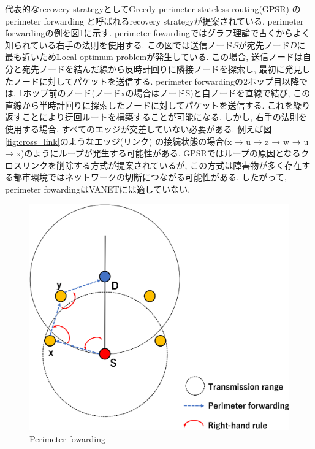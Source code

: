 \documentclass[10pt]{jreport}
\begin{document}
代表的なrecovery strategyとしてGreedy perimeter stateless routing(GPSR) \cite{6}の perimeter forwarding
と呼ばれるrecovery strategyが提案されている. perimeter forwardingの例を図\ref{fig:Perimeter}に示す. perimeter fowardingではグラフ理論で古くからよく知られている右手の法則を使用する. この図では送信ノード$S$が宛先ノード$D$に最も近いためLocal optimum problemが発生している. この場合, 送信ノードは自分と宛先ノードを結んだ線から反時計回りに隣接ノードを探索し, 最初に発見したノードに対してパケットを送信する. perimeter forwardingの2ホップ目以降では, 1ホップ前のノード(ノードxの場合はノードS)と自ノードを直線で結び, この直線から半時計回りに探索したノードに対してパケットを送信する. これを繰り返すことにより迂回ルートを構築することが可能になる. 
しかし, 右手の法則を使用する場合, すべてのエッジが交差していない必要がある. 例えば図\ref{fig:cross_link}のようなエッジ(リンク) の接続状態の場合(x → u → z → w → u → x)のようにループが発生する可能性がある. GPSRではループの原因となるクロスリンクを削除する方式が提案されているが, この方式は障害物が多く存在する都市環境ではネットワークの切断につながる可能性がある. したがって, perimeter fowardingはVANETには適していない.




\begin{figure}[!ht]
	\centering
	\includegraphics[width=130mm]{figures/Perimeter.eps}
	\caption{Perimeter fowarding}
	\label{fig:Perimeter}
\end{figure}
\end{document}
